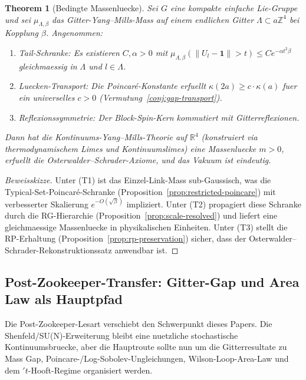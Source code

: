 \documentclass[12pt,a4paper]{article}
\theoremstyle{definition}
\theoremstyle{plain}
\newtheorem{theorem}[definition]{Theorem}
\theoremstyle{remark}
\begin{document}
\begin{theorem}[Bedingte Massenluecke]
\label{thm:conditional-gap}
Sei $G$ eine kompakte einfache Lie-Gruppe und sei $\mu_{\Lambda,\beta}$ das Gitter-Yang--Mills-Mass auf einem endlichen Gitter $\Lambda \subset a\mathbb{Z}^4$ bei Kopplung $\beta$. Angenommen:
\begin{enumerate}
\item[\textup{(T1)}] \emph{Tail-Schranke:} Es existieren $C, \alpha > 0$ mit $\mu_{\Lambda,\beta}(\|U_l - \mathbf{1}\| > t) \leq C e^{-\alpha t^2 \beta}$ gleichmaessig in $\Lambda$ und $l \in \Lambda$.
\item[\textup{(T2)}] \emph{Luecken-Transport:} Die Poincar\'e-Konstante erfuellt $\kappa(2a) \geq c \cdot \kappa(a)$ fuer ein universelles $c > 0$ (Vermutung~\ref{conj:gap-transport}).
\item[\textup{(T3)}] \emph{Reflexionssymmetrie:} Der Block-Spin-Kern kommutiert mit Gitterreflexionen.
\end{enumerate}
Dann hat die Kontinuums-Yang--Mills-Theorie auf $\mathbb{R}^4$ (konstruiert via thermodynamischem Limes und Kontinuumslimes) eine Massenluecke $m > 0$, erfuellt die Osterwalder--Schrader-Axiome, und das Vakuum ist eindeutig.
\end{theorem}

\begin{proof}[Beweisskizze]
Unter (T1) ist das Einzel-Link-Mass sub-Gaussisch, was die Typical-Set-Poincar\'e-Schranke (Proposition~\ref{prop:restricted-poincare}) mit verbesserter Skalierung $e^{-O(\sqrt{\beta})}$ impliziert. Unter (T2) propagiert diese Schranke durch die RG-Hierarchie (Proposition~\ref{prop:scale-resolved}) und liefert eine gleichmaessige Massenluecke in physikalischen Einheiten. Unter (T3) stellt die RP-Erhaltung (Proposition~\ref{prop:rp-preservation}) sicher, dass der Osterwalder--Schrader-Rekonstruktionssatz anwendbar ist.
\end{proof}

\subsection{Post-Zookeeper-Transfer: Gitter-Gap und Area Law als Hauptpfad}
\label{subsec:zookeeper-ym-transfer}

Die Post-Zookeeper-Lesart verschiebt den Schwerpunkt dieses Papers.  Die
Shenfeld/SU(N)-Erweiterung bleibt eine nuetzliche stochastische
Kontinuumsbruecke, aber die Hauptroute sollte nun um die Gitterresultate
zu Mass Gap, Poincare-/Log-Sobolev-Ungleichungen, Wilson-Loop-Area-Law
und dem $'t$-Hooft-Regime organisiert werden.
\end{document}
